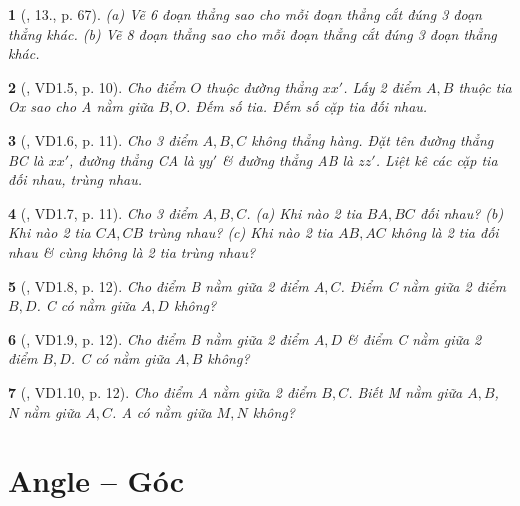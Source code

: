 \documentclass{article}
\newtheorem{baitoan}{}
\begin{document}
\begin{baitoan}[\cite{Binh_Toan_6_tap_2}, 13., p. 67]
	(a) Vẽ 6 đoạn thẳng sao cho mỗi đoạn thẳng cắt đúng 3 đoạn thẳng khác. (b) Vẽ 8 đoạn thẳng sao cho mỗi đoạn thẳng cắt đúng 3 đoạn thẳng khác.
\end{baitoan}

\begin{baitoan}[\cite{TLCT_THCS_Toan_6_hinh_hoc}, VD1.5, p. 10]
	Cho điểm $O$ thuộc đường thẳng $xx'$. Lấy 2 điểm $A,B$ thuộc tia Ox sao cho A nằm giữa $B,O$. Đếm số tia. Đếm số cặp tia đối nhau.
\end{baitoan}

\begin{baitoan}[\cite{TLCT_THCS_Toan_6_hinh_hoc}, VD1.6, p. 11]
	Cho 3 điểm $A,B,C$ không thẳng hàng. Đặt tên đường thẳng BC là $xx'$, đường thẳng CA là $yy'$ \& đường thẳng AB là $zz'$. Liệt kê các cặp tia đối nhau, trùng nhau.
\end{baitoan}

\begin{baitoan}[\cite{TLCT_THCS_Toan_6_hinh_hoc}, VD1.7, p. 11]
	Cho 3 điểm $A,B,C$. (a) Khi nào 2 tia $BA,BC$ đối nhau? (b) Khi nào 2 tia $CA,CB$ trùng nhau? (c) Khi nào 2 tia $AB,AC$ không là 2 tia đối nhau \& cùng không là 2 tia trùng nhau?
\end{baitoan}

\begin{baitoan}[\cite{TLCT_THCS_Toan_6_hinh_hoc}, VD1.8, p. 12]
	Cho điểm B nằm giữa 2 điểm $A,C$. Điểm C nằm giữa 2 điểm $B,D$. C có nằm giữa $A,D$ không?
\end{baitoan}

\begin{baitoan}[\cite{TLCT_THCS_Toan_6_hinh_hoc}, VD1.9, p. 12]
	Cho điểm B nằm giữa 2 điểm $A,D$ \& điểm C nằm giữa 2 điểm $B,D$. C có nằm giữa $A,B$ không?
\end{baitoan}

\begin{baitoan}[\cite{TLCT_THCS_Toan_6_hinh_hoc}, VD1.10, p. 12]
	Cho điểm A nằm giữa 2 điểm $B,C$. Biết M nằm giữa $A,B$, N nằm giữa $A,C$. A có nằm giữa $M,N$ không?
\end{baitoan}


\section{Angle -- Góc}
\end{document}
